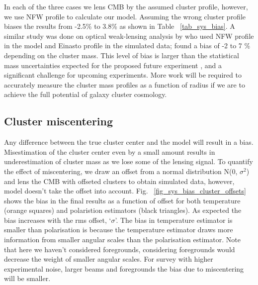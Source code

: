  In each of the three cases we lens CMB by the assumed cluster profile, however, we use NFW profile to calculate our model.
 Assuming the wrong cluster profile biases the results from -2.5\% to 3.8\% as shown in Table ~\ref{tab_sys_bias}. 
 A similar study was done on optical weak-lensing analysis by \citet{sereno16} who used NFW profile in the model and Einasto profile in the simulated data; \citet{sereno16} found a bias of -2 to 7 \% depending on the cluster mass. This level of bias is larger than the statistical mass uncertainties expected for the proposed future experiment \citep{cmbs4-sb1}, and a significant challenge for upcoming experiments.
More work will be required to accurately measure the cluster mass profiles as a function of radius if we are to achieve the full potential of galaxy cluster cosmology. 

\subsection{Cluster miscentering}

Any difference between the true cluster center and the model will result in a bias.
 Misestimation of the cluster center even by a small amount results in underestimation of cluster mass as we lose some of the lensing signal.
To quantify the effect of miscentering, we draw an offset from a normal distribution N(0, $\sigma^{2}$) and lens the CMB with offseted clusters to obtain simulated data, however, model doesn't take the offset into account.
Fig. ~\ref{fig_sys_bias_cluster_offsets} shows the bias in the final results as a function of offset for both temperature (orange squares) and polaristion estimators (black triangles).
As expected the bias increases with the rms offset, `$\sigma$'.
The bias in temperature estimator is smaller than polarisation is because the temperature estimator draws more information from smaller angular scales than the polarisation estimator. Note that here we haven't considered foregrounds, considering foregrounds would decrease the weight of smaller angular scales. For survey with higher experimental noise, larger beams and foregrounds the bias due to miscentering will be smaller.


